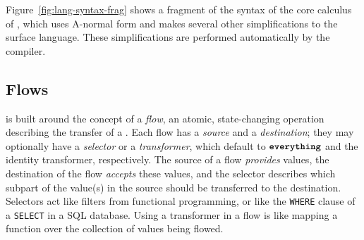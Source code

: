 \documentclass[dvipsnames, usenames, sigconf]{acmart}
\begin{document}
Figure~\ref{fig:lang-syntax-frag} shows a fragment of the syntax of the core calculus of \langName, which uses A-normal form and makes several other simplifications to the surface \langName language.
These simplifications are performed automatically by the compiler.

\subsection{Flows}
\langName is built around the concept of a \emph{flow}, an atomic, state-changing operation describing the transfer of a \assetTxt.
Each flow has a \emph{source} and a \emph{destination}; they may optionally have a \emph{selector} or a \emph{transformer}, which default to $\textbf{\texttt{everything}}$ and the identity transformer, respectively.
The source of a flow \emph{provides} values, the destination of the flow \emph{accepts} these values, and the selector describes which subpart of the value(s) in the source should be transferred to the destination.
Selectors act like filters from functional programming, or like the \lstinline{WHERE} clause of a \lstinline{SELECT} in a SQL database.
Using a transformer in a flow is like mapping a function over the collection of values being flowed.
\end{document}
